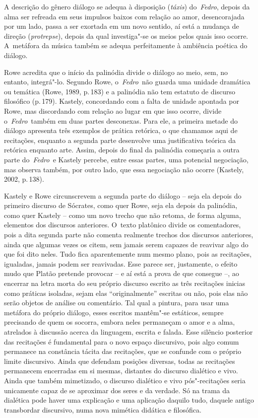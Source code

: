  

A descrição do gênero diálogo se adequa à disposição (\emph{táxis})
do~\emph{Fedro}, depois da alma ser refreada em seus impulsos baixos com
relação ao amor, desencorajada por um lado, passa a ser exortada em um
novo sentido, aí está a mudança de direção (\emph{protrepse}), depois da
qual investiga"-se os meios pelos quais isso ocorre. A~metáfora da música
também se adequa perfeitamente à ambiência poética do diálogo.

Rowe acredita que o início da palinódia divide o diálogo ao meio, sem,
no entanto, integrá"-lo. Segundo Rowe, o~\emph{Fedro}~não guarda uma
unidade dramática ou temática (Rowe, 1989, p.\,183) e a palinódia não tem
estatuto de discurso filosófico (p.\,179). Kastely, concordando com a
falta de unidade apontada por Rowe, mas discordando com relação ao lugar
em que isso ocorre, divide o~\emph{Fedro}~também em duas partes
desconexas. Para ele, a primeira metade do diálogo apresenta três
exemplos de prática retórica, o que chamamos aqui de recitações,
enquanto a segunda parte desenvolve uma justificativa teórica da
retórica enquanto arte. Assim, depois do final da palinódia começaria a
outra parte do~\emph{Fedro}~e Kastely percebe, entre essas partes, uma
potencial negociação, mas observa também, por outro lado, que essa
negociação não ocorre (Kastely, 2002, p.\,138).

Kastely e Rowe circunscrevem a segunda parte do diálogo -- seja ela depois
do primeiro discurso de Sócrates, como quer Rowe, seja ela depois da
palinódia, como quer Kastely -- como um novo trecho que não retoma, de
forma alguma, elementos dos discursos anteriores. O~texto platônico
divide os comentadores, pois a dita segunda parte não comenta realmente
trechos dos discursos anteriores, ainda que algumas vezes os citem, sem
jamais serem capazes de reavivar algo do que foi dito neles. Tudo fica
aparentemente num mesmo plano, pois as recitações, igualadas, jamais
podem ser reavivadas. Esse parece ser, justamente, o efeito mudo que
Platão pretende provocar -- e aí está a prova de que consegue \mbox{--,} ao
encerrar na letra morta do seu próprio discurso escrito as três
recitações inicias como práticas isoladas, sejam elas ``originalmente''
escritas ou não, pois elas não serão objetos de análise ou comentário.
Tal qual a pintura, para usar uma metáfora do próprio diálogo, esses
escritos mantêm"-se estáticos, sempre precisando de quem os socorra,
embora neles permaneçam o amor e a alma, atrelados à discussão acerca da
linguagem, escrita e falada. Esse silêncio posterior das recitações é
fundamental para o novo espaço discursivo, pois algo comum permanece na
constância tácita das recitações, que se confunde com o próprio limite
discursivo. Ainda que defendam posições diversas, todas as recitações
permanecem encerradas em si mesmas, distantes do discurso dialético e
vivo. Ainda que também mimetizado, o discurso dialético e vivo
pós"-recitações seria unicamente capaz de se aproximar dos seres e da
verdade. Só na trama da dialética pode haver uma explicação e uma
aplicação daquilo tudo, daquele antigo transbordar discursivo, numa nova
mimética didática e filosófica.

